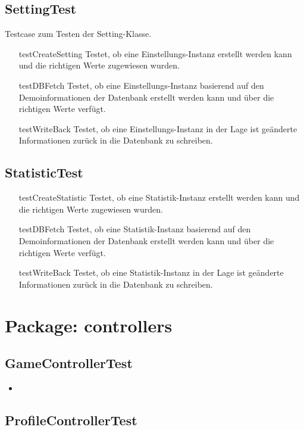 \documentclass[parskip=full]{scrreprt}
\begin{document}
\subsection{SettingTest}

Testcase zum Testen der Setting-Klasse.

\begin{itemize}
	\item[testCreateSetting] Testet, ob eine Einstellungs-Instanz erstellt werden kann und die richtigen Werte zugewiesen wurden.
	\item[testDBFetch] Testet, ob eine Einstellungs-Instanz basierend auf den Demoinformationen der Datenbank erstellt werden kann und über die richtigen Werte verfügt.
	\item[testWriteBack] Testet, ob eine Einstellungs-Instanz in der Lage ist geänderte Informationen zurück in die Datenbank zu schreiben.
\end{itemize}

\subsection{StatisticTest}

\begin{itemize}
	\item[testCreateStatistic] Testet, ob eine Statistik-Instanz erstellt werden kann und die richtigen Werte zugewiesen wurden.
	\item[testDBFetch] Testet, ob eine Statistik-Instanz basierend auf den Demoinformationen der Datenbank erstellt werden kann und über die richtigen Werte verfügt.
	\item[testWriteBack] Testet, ob eine Statistik-Instanz in der Lage ist geänderte Informationen zurück in die Datenbank zu schreiben.
\end{itemize}

\section{Package: controllers}

\subsection{GameControllerTest}

\begin{itemize}
	\item 
\end{itemize}

\subsection{ProfileControllerTest}
\end{document}
